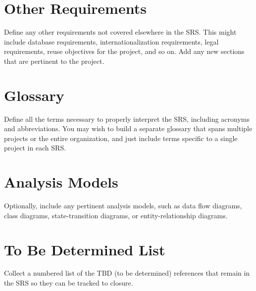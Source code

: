 \documentclass[a4paper,10pt]{article}
\begin{document}

\section{Other Requirements}
Define any other requirements not covered elsewhere in the SRS. This might include database requirements, internationalization requirements, legal requirements, reuse objectives for the project, and so on. Add any new sections that are pertinent to the project.

\begin{appendices}
\section{Glossary}
Define all the terms necessary to properly interpret the SRS, including acronyms and abbreviations. You may wish to build a separate glossary that spans multiple projects or the entire organization, and just include terms specific to a single project in each SRS.
\section{Analysis Models}
Optionally, include any pertinent analysis models, such as data flow diagrams, class diagrams, state-transition diagrams, or entity-relationship diagrams.
\section{To Be Determined List}
Collect a numbered list of the TBD (to be determined) references that remain in the SRS so they can be tracked to closure.
\end{appendices}
\end{document}
